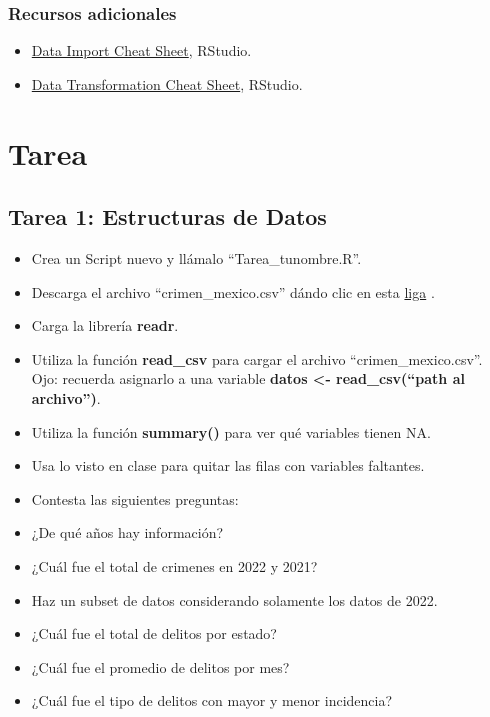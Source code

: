 \documentclass[
]{book}
\providecommand{\tightlist}{%
  \setlength{\itemsep}{0pt}\setlength{\parskip}{0pt}}
\begin{document}
\hypertarget{recursos-adicionales}{%
\subsection*{Recursos adicionales}\label{recursos-adicionales}}

\begin{itemize}
\item
  \href{https://github.com/rstudio/cheatsheets/raw/master/data-import.pdf}{Data Import Cheat Sheet},
  RStudio.
\item
  \href{https://github.com/rstudio/cheatsheets/raw/master/data-transformation.pdf}{Data Transformation Cheat Sheet},
  RStudio.
\end{itemize}

\hypertarget{tarea}{%
\chapter{Tarea}\label{tarea}}

\hypertarget{tarea-1-estructuras-de-datos}{%
\section{Tarea 1: Estructuras de Datos}\label{tarea-1-estructuras-de-datos}}

\begin{itemize}
\tightlist
\item
  Crea un Script nuevo y llámalo ``Tarea\_tunombre.R''.
\item
  Descarga el archivo ``crimen\_mexico.csv'' dándo clic en esta \href{https://www.dropbox.com/s/nq3sg9gnvis3ezy/crimen_mexico.csv?dl=1}{liga} .\\
\item
  Carga la librería \textbf{readr}.
\item
  Utiliza la función \textbf{read\_csv} para cargar el archivo ``crimen\_mexico.csv''. Ojo: recuerda asignarlo a una variable \textbf{datos \textless- read\_csv(``path al archivo'')}.
\item
  Utiliza la función \textbf{summary()} para ver qué variables tienen NA.
\item
  Usa lo visto en clase para quitar las filas con variables faltantes.
\item
  Contesta las siguientes preguntas:
\item
  ¿De qué años hay información?
\item
  ¿Cuál fue el total de crimenes en 2022 y 2021?
\item
  Haz un subset de datos considerando solamente los datos de 2022.
\item
  ¿Cuál fue el total de delitos por estado?
\item
  ¿Cuál fue el promedio de delitos por mes?
\item
  ¿Cuál fue el tipo de delitos con mayor y menor incidencia?
\end{itemize}
\end{document}
